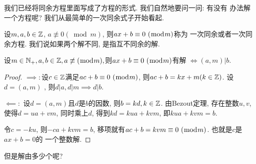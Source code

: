  我们已经将同余方程里面写成了方程的形式. 我们自然地要问一问: 有没有
办法解一个方程呢? 我们从最简单的一次同余式子开始看起. 

\begin{definition}
    设$m,a,b\in {\mathbb Z}$, $a\not \equiv 0 (\bmod m)$, 则${ax+b} \equiv {0} ~(\bmod {m})$称为
    一次同余或者一次同余方程. 我们说如果两个解不同, 是指互不同余的解. 
\end{definition}

\begin{theorem}
    设$m\in \mathbb N_+, a,b\in {\mathbb Z}, a\not \equiv (\bmod m), $则${ax+b} \equiv {0} ~(\bmod {m})$有解
    $\iff (a,m)|b$.  
\end{theorem}

\begin{proof}
    $\implies: $设$c\in {\mathbb Z}$满足${ac+b} \equiv {0} ~(\bmod {m})$, 则$ac+b=kx+m(k\in {\mathbb Z})$. 设$d=(a,m)$
    , 则$d|a, d|m \implies d|b. $ 
    
    $\impliedby: $ 设$d=(a,m)$且$d$是$b$的因数, 则$b=kd, k\in {\mathbb Z}$. 由Bezout定理, 
    存在整数$u,v$, 使得$d=ua+vm$, 同时乘上$d$, 得到$kd=kua+kvm$, 即$kua+kvm=b$. 

    令$c=-ku$, 则$-ca+kvm=b$, 移项就有$ac+b={kvm} \equiv {0} ~(\bmod {m})$. 也就是$c$是$ax+b=0$的
    一个整数解.
\end{proof}

但是解由多少个呢? 